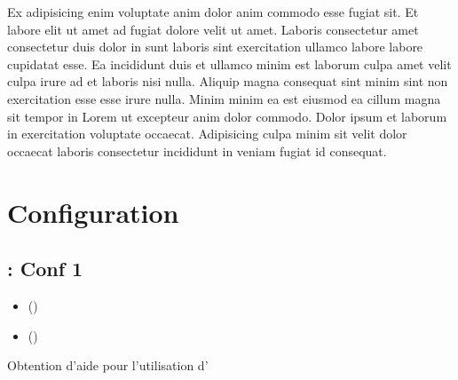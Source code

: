 \documentclass[a4paper,10pt,french]{sphinxmanual}
\begin{document}
Ex adipisicing enim voluptate anim dolor anim commodo esse fugiat sit. Et labore elit ut amet ad fugiat dolore velit ut amet. Laboris consectetur amet consectetur duis dolor in sunt laboris sint exercitation ullamco labore labore cupidatat esse. Ea incididunt duis et ullamco minim est laborum culpa amet velit culpa irure ad et laboris nisi nulla. Aliquip magna consequat sint minim sint non exercitation esse esse irure nulla. Minim minim ea est eiusmod ea cillum magna sit tempor in Lorem ut excepteur anim dolor commodo. Dolor ipsum et laborum in exercitation voluptate occaecat. Adipisicing culpa minim sit velit dolor occaecat laboris consectetur incididunt in veniam fugiat id consequat.


\chapter{Configuration}
\label{\detokenize{docs/refs/config/index::doc}}\label{\detokenize{docs/refs/config/index:autodesk}}\label{\detokenize{docs/refs/config/index:configuration}}

\section{ : Conf 1}
\label{\detokenize{docs/refs/config/config-initiale:acad-conf-1}}\label{\detokenize{docs/refs/config/config-initiale::doc}}

\begin{sphinxShadowBox}
\begin{itemize}
\item {} 
\label{\detokenize{docs/refs/config/config-initiale:id1}}{\hyperref[\detokenize{docs/refs/config/config-initiale:aide-integree}]{}} ()

\item {} 
\label{\detokenize{docs/refs/config/config-initiale:id2}}{\hyperref[\detokenize{docs/refs/config/config-initiale:aide-en-ligne-internet}]{}} ()

\end{itemize}
\end{sphinxShadowBox}

Obtention d'aide pour l'utilisation d'
\end{document}
